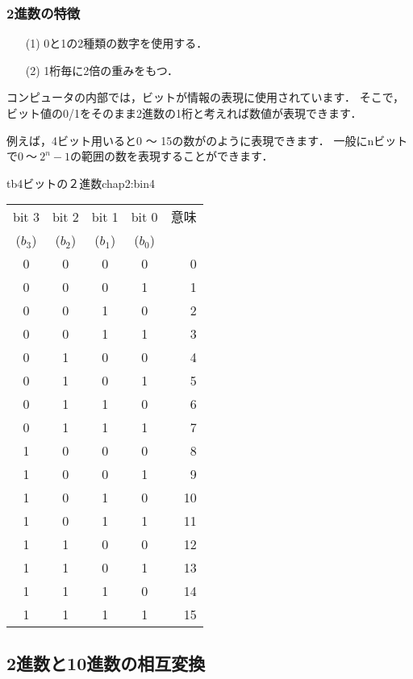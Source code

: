 \subsubsection{2進数の特徴}
\begin{enumerate}
\item[(1)] 0と1の2種類の数字を使用する．
\item[(2)] 1桁毎に2倍の重みをもつ．
\end{enumerate}

コンピュータの内部では，ビットが情報の表現に使用されています．
そこで，ビット値の0/1をそのまま2進数の1桁と考えれば数値が表現できます．

例えば，4ビット用いると0 〜 15の数がのように表現できます．
一般にnビットで$0~〜~2^n-1$の範囲の数を表現することができます．

\begin{mytable}{tb}{4ビットの２進数}{chap2:bin4}
{\small\begin{tabular}{c|c|c|c|r}
\hline\hline
bit 3 & bit 2 & bit 1 & bit 0 & 意味\\
($b_3$)&($b_2$)&($b_1$)&($b_0$)&\\
\hline
 0 &  0 &  0 &  0 &  0 \\
 0 &  0 &  0 &  1 &  1 \\
 0 &  0 &  1 &  0 &  2 \\
 0 &  0 &  1 &  1 &  3 \\
 0 &  1 &  0 &  0 &  4 \\
 0 &  1 &  0 &  1 &  5 \\
 0 &  1 &  1 &  0 &  6 \\
 0 &  1 &  1 &  1 &  7 \\
 1 &  0 &  0 &  0 &  8 \\
 1 &  0 &  0 &  1 &  9 \\
 1 &  0 &  1 &  0 & 10 \\
 1 &  0 &  1 &  1 & 11 \\
 1 &  1 &  0 &  0 & 12 \\
 1 &  1 &  0 &  1 & 13 \\
 1 &  1 &  1 &  0 & 14 \\
 1 &  1 &  1 &  1 & 15 \\
\end{tabular}}
\end{mytable}


\subsection{2進数と10進数の相互変換}

